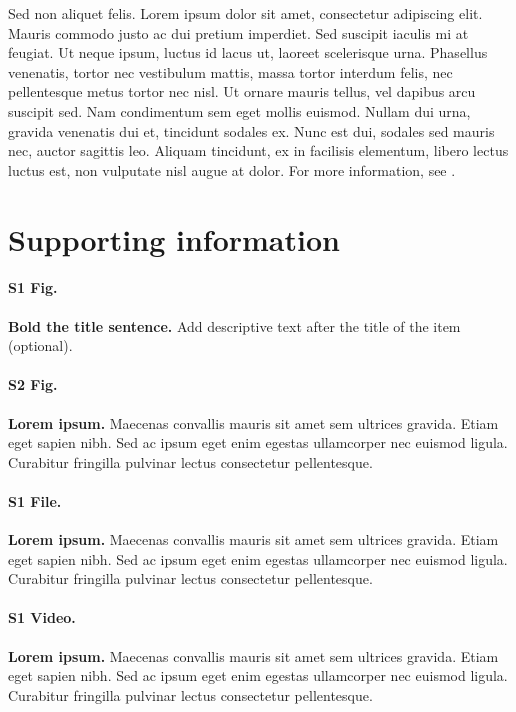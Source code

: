\documentclass[10pt,letterpaper]{article}
\begin{document}
Sed non aliquet felis. Lorem ipsum dolor sit amet, consectetur adipiscing elit. Mauris commodo justo ac dui pretium imperdiet. Sed suscipit iaculis mi at feugiat. Ut neque ipsum, luctus id lacus ut, laoreet scelerisque urna. Phasellus venenatis, tortor nec vestibulum mattis, massa tortor interdum felis, nec pellentesque metus tortor nec nisl. Ut ornare mauris tellus, vel dapibus arcu suscipit sed. Nam condimentum sem eget mollis euismod. Nullam dui urna, gravida venenatis dui et, tincidunt sodales ex. Nunc est dui, sodales sed mauris nec, auctor sagittis leo. Aliquam tincidunt, ex in facilisis elementum, libero lectus luctus est, non vulputate nisl augue at dolor. For more information, see .

\section*{Supporting information}

\paragraph*{S1 Fig.}
\label{S1_Fig}
\textbf{Bold the title sentence.} Add descriptive text after the title of the item (optional).

\paragraph*{S2 Fig.}
\label{S2_Fig}
\textbf{Lorem ipsum.} Maecenas convallis mauris sit amet sem ultrices gravida. Etiam eget sapien nibh. Sed ac ipsum eget enim egestas ullamcorper nec euismod ligula. Curabitur fringilla pulvinar lectus consectetur pellentesque.

\paragraph*{S1 File.}
\label{S1_File}
\textbf{Lorem ipsum.}  Maecenas convallis mauris sit amet sem ultrices gravida. Etiam eget sapien nibh. Sed ac ipsum eget enim egestas ullamcorper nec euismod ligula. Curabitur fringilla pulvinar lectus consectetur pellentesque.

\paragraph*{S1 Video.}
\label{S1_Video}
\textbf{Lorem ipsum.}  Maecenas convallis mauris sit amet sem ultrices gravida. Etiam eget sapien nibh. Sed ac ipsum eget enim egestas ullamcorper nec euismod ligula. Curabitur fringilla pulvinar lectus consectetur pellentesque.
\end{document}
